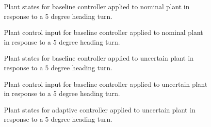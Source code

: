 \newpage
\begin{figure}[H]
  \hspace{-0.5in}
  \noindent{}
  \vspace{-1.0in}
  \caption{Plant states for baseline controller applied to nominal plant in response to a 5 degree heading turn.\label{fig.baselineNominalLatrState}}
\end{figure}

\newpage
\begin{figure}[H]
  \hspace{-0.5in}
  \noindent{}
  \vspace{-1.0in}
  \caption{Plant control input for baseline controller applied to nominal plant in response to a 5 degree heading turn.\label{fig.baselineNominalLatrControl}}
\end{figure}

\newpage
\begin{figure}[H]
  \hspace{-0.5in}
  \noindent{}
  \vspace{-1.0in}
  \caption{Plant states for baseline controller applied to uncertain plant in response to a 5 degree heading turn.\label{fig.baselineUncertainLatrState}}
\end{figure}

\newpage
\begin{figure}[H]
  \hspace{-0.5in}
  \noindent{}
  \vspace{-1.0in}
  \caption{Plant control input for baseline controller applied to uncertain plant in response to a 5 degree heading turn.\label{fig.baselineUncertainLatrControl}}
\end{figure}

\newpage
\begin{figure}[H]
  \hspace{-0.5in}
  \noindent{}
  \vspace{-1.0in}
  \caption{Plant states for adaptive controller applied to uncertain plant in response to a 5 degree heading turn.\label{fig.adaptiveUncertainLatrState}}
\end{figure}

